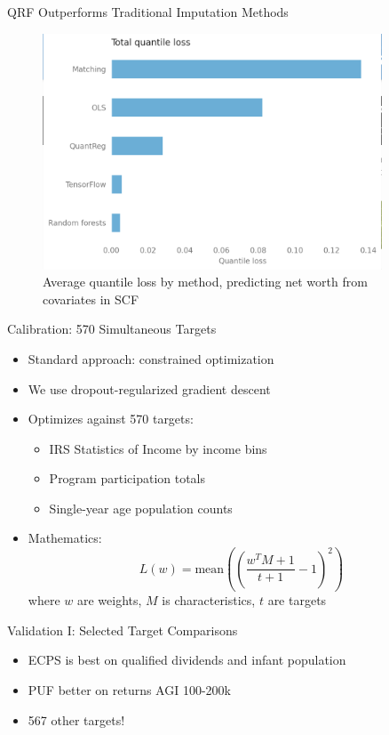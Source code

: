 \documentclass{beamer}
\begin{document}
\begin{frame}{QRF Outperforms Traditional Imputation Methods}
    \begin{figure}
        \centering
        \includegraphics[width=0.9\textwidth, height=0.7\textheight, keepaspectratio]{../../paper/figures/quantile_loss.png}
        \caption{Average quantile loss by method, predicting net worth from covariates in SCF}
    \end{figure}
\end{frame}

\begin{frame}{Calibration: 570 Simultaneous Targets}
    \begin{itemize}
        \item Standard approach: constrained optimization
        \item We use dropout-regularized gradient descent
        \item Optimizes against 570 targets:
        \begin{itemize}
            \item IRS Statistics of Income by income bins
            \item Program participation totals
            \item Single-year age population counts
        \end{itemize}
        \item Mathematics:
        \[ L(w) = \text{mean}\left(\left(\frac{w^T M + 1}{t + 1} - 1\right)^2\right) \]
        where $w$ are weights, $M$ is characteristics, $t$ are targets
    \end{itemize}
\end{frame}

\begin{frame}{Validation I: Selected Target Comparisons}
    \begin{table}
        \small
        \centering
        
    \end{table}
    \begin{itemize}
        \item ECPS is best on qualified dividends and infant population
        \item PUF better on returns AGI 100-200k
        \item 567 other targets!
    \end{itemize}
\end{frame}
\end{document}
